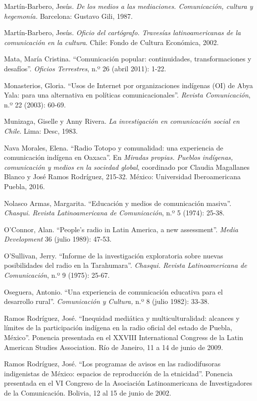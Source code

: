 \documentclass{tufte-handout}
\begin{document}
\begin{hangparas}{.25in}{1}
Martín-Barbero, Jesús. \emph{De los medios a las mediaciones.
Comunicación, cultura y hegemonía.} Barcelona: Gustavo Gili, 1987.

Martín-Barbero, Jesús. \emph{Oficio del cartógrafo. Travesías
latinoamericanas de la comunicación en la cultura}. Chile: Fondo de
Cultura Económica, 2002.

Mata, María Cristina. ``Comunicación popular: continuidades,
transformaciones y desafíos''. \emph{Oficios Terrestres}, n.º 26 (abril
2011): 1-22.

Monasterios, Gloria. ``Usos de Internet por organizaciones indígenas
(OI) de Abya Yala: para una alternativa en políticas comunicacionales''.
\emph{Revista Comunicación}, n.º 22 (2003): 60-69.

Munizaga, Giselle y Anny Rivera. \emph{La investigación en comunicación
social en Chile}. Lima: Desc, 1983.

Nava Morales, Elena. ``Radio Totopo y comunalidad: una experiencia de
comunicación indígena en Oaxaca''. En \emph{Miradas propias. Pueblos
indígenas, comunicación y medios en la sociedad global}, coordinado por
Claudia Magallanes Blanco y José Ramos Rodríguez, 215-32. México:
Universidad Iberoamericana Puebla, 2016.

Nolasco Armas, Margarita. ``Educación y medios de comunicación masiva''.
\emph{Chasqui. Revista Latinoamericana de Comunicación}, n.º 5 (1974):
25-38.

O'Connor, Alan. ``People's radio in Latin America, a new assessment''.
\emph{Media Development} 36 (julio 1989): 47-53.

O'Sullivan, Jerry. ``Informe de la investigación exploratoria sobre
nuevas posibilidades del radio en la Tarahumara''. \emph{Chasqui.
Revista Latinoamericana de Comunicación}, n.º 9 (1975): 25-67.

Oseguera, Antonio. ``Una experiencia de comunicación educativa para el
desarrollo rural''. \emph{Comunicación y Cultura,} n.º 8 (julio 1982):
33-38.

Ramos Rodríguez, José. ``Inequidad mediática y multiculturalidad:
alcances y límites de la participación indígena en la radio oficial del
estado de Puebla, México''. Ponencia presentada en el XXVIII
International Congress de la Latin American Studies Association. Río de
Janeiro, 11 a 14 de junio de 2009.

Ramos Rodríguez, José. ``Los programas de avisos en las radiodifusoras
indigenistas de México: espacios de reproducción de la etnicidad''.
Ponencia presentada en el VI Congreso de la Asociación Latinoamericana
de Investigadores de la Comunicación. Bolivia, 12 al 15 de junio de
2002.


\end{hangparas}
\end{document}
